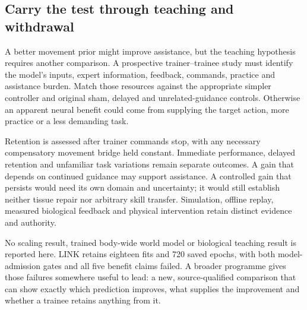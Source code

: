 \subsection{Carry the test through teaching and withdrawal}

A better movement prior might improve assistance, but the teaching hypothesis requires another comparison. A prospective trainer--trainee study must identify the model's inputs, expert information, feedback, commands, practice and assistance burden. Match those resources against the appropriate simpler controller and original sham, delayed and unrelated-guidance controls. Otherwise an apparent neural benefit could come from supplying the target action, more practice or a less demanding task.

Retention is assessed after trainer commands stop, with any necessary compensatory movement bridge held constant. Immediate performance, delayed retention and unfamiliar task variations remain separate outcomes. A gain that depends on continued guidance may support assistance. A controlled gain that persists would need its own domain and uncertainty; it would still establish neither tissue repair nor arbitrary skill transfer. Simulation, offline replay, measured biological feedback and physical intervention retain distinct evidence and authority.

No scaling result, trained body-wide world model or biological teaching result is reported here. LINK retains eighteen fits and 720 saved epochs, with both model-admission gates and all five benefit claims failed. A broader programme gives those failures somewhere useful to lead: a new, source-qualified comparison that can show exactly which prediction improves, what supplies the improvement and whether a trainee retains anything from it.

